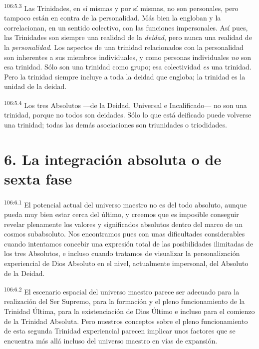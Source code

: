 \documentclass[twoside, 11pt]{book}
\begin{document}
\par
\textsuperscript{106:5.3} Las Trinidades, en sí mismas y por sí mismas, no son personales, pero tampoco están en contra de la personalidad. Más bien la engloban y la correlacionan, en un sentido colectivo, con las funciones impersonales. Así pues, las Trinidades son siempre una realidad de la \textit{deidad}, pero nunca una realidad de la \textit{personalidad}. Los aspectos de una trinidad relacionados con la personalidad son inherentes a sus miembros individuales, y como personas individuales \textit{no} son esa trinidad. Sólo son una trinidad como grupo; esa colectividad \textit{es} una trinidad. Pero la trinidad siempre incluye a toda la deidad que engloba; la trinidad es la unidad de la deidad.

\par
\textsuperscript{106:5.4} Los tres Absolutos ---de la Deidad, Universal e Incalificado--- no son una trinidad, porque no todos son deidades. Sólo lo que está deificado puede volverse una trinidad; todas las demás asociaciones son triunidades o triodidades.

\section*{6. La integración absoluta o de sexta fase}
\par
\textsuperscript{106:6.1} El potencial actual del universo maestro no es del todo absoluto, aunque pueda muy bien estar cerca del último, y creemos que es imposible conseguir revelar plenamente los valores y significados absolutos dentro del marco de un cosmos subabsoluto. Nos encontramos pues con unas dificultades considerables cuando intentamos concebir una expresión total de las posibilidades ilimitadas de los tres Absolutos, e incluso cuando tratamos de visualizar la personalización experiencial de Dios Absoluto en el nivel, actualmente impersonal, del Absoluto de la Deidad.

\par
\textsuperscript{106:6.2} El escenario espacial del universo maestro parece ser adecuado para la realización del Ser Supremo, para la formación y el pleno funcionamiento de la Trinidad Última, para la existenciación de Dios Último e incluso para el comienzo de la Trinidad Absoluta. Pero nuestros conceptos sobre el pleno funcionamiento de esta segunda Trinidad experiencial parecen implicar unos factores que se encuentra más allá incluso del universo maestro en vías de expansión.
\end{document}
